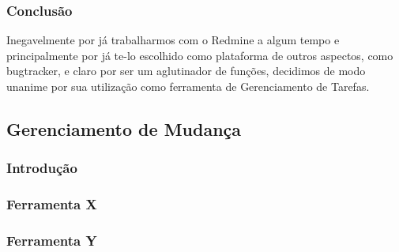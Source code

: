 \documentclass[12pt,a4paper]{article}
\begin{document}
		
		\subsubsection{Conclusão}
			Inegavelmente por já trabalharmos com o Redmine a algum tempo e principalmente por já te-lo escolhido como plataforma de outros aspectos, como bugtracker, e claro por ser um aglutinador de funções, decidimos de modo unanime por sua utilização como ferramenta de Gerenciamento de Tarefas. 
		
		
	
	\subsection{Gerenciamento de Mudança}
		\subsubsection{Introdução}
		\subsubsection{Ferramenta X}
		\subsubsection{Ferramenta Y}
		
		

\clearpage
\nocite{*}
		
		
\end{document}

